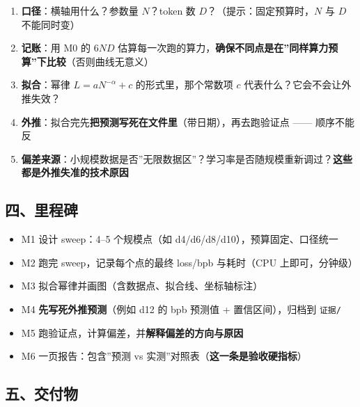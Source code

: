 \documentclass[
  chinese,
  11pt,
]{ctexart}
\providecommand{\tightlist}{%
  \setlength{\itemsep}{0pt}\setlength{\parskip}{0pt}}
\begin{document}
\begin{enumerate}
\def\labelenumi{\arabic{enumi}.}
\tightlist
\item
  \textbf{口径}：横轴用什么？参数量 \(N\)？token 数 \(D\)？（提示：固定预算时，\(N\) 与 \(D\) 不能同时变）
\item
  \textbf{记账}：用 M0 的 \(6ND\) 估算每一次跑的算力，\textbf{确保不同点是在''同样算力预算''下比较}（否则曲线无意义）
\item
  \textbf{拟合}：幂律 \(L = aN^{-\alpha} + c\) 的形式里，那个常数项 \(c\) 代表什么？它会不会让外推失效？
\item
  \textbf{外推}：拟合完先\textbf{把预测写死在文件里}（带日期），再去跑验证点 ------ 顺序不能反
\item
  \textbf{偏差来源}：小规模数据是否''无限数据区''？学习率是否随规模重新调过？\textbf{这些都是外推失准的技术原因}
\end{enumerate}

\subsection{四、里程碑}\label{ux56dbux91ccux7a0bux7891}

\begin{itemize}
\tightlist
\item[$\square$]
  M1 设计 sweep：4--5 个规模点（如 d4/d6/d8/d10），预算固定、口径统一
\item[$\square$]
  M2 跑完 sweep，记录每个点的最终 loss/bpb 与耗时（CPU 上即可，分钟级）
\item[$\square$]
  M3 拟合幂律并画图（含数据点、拟合线、坐标轴标注）
\item[$\square$]
  M4 \textbf{先写死外推预测}（例如 d12 的 bpb 预测值 + 置信区间），归档到 \texttt{证据/}
\item[$\square$]
  M5 跑验证点，计算偏差，并\textbf{解释偏差的方向与原因}
\item[$\square$]
  M6 一页报告：包含''预测 vs 实测''对照表（\textbf{这一条是验收硬指标}）
\end{itemize}

\subsection{五、交付物}\label{ux4e94ux4ea4ux4ed8ux7269}
\end{document}
